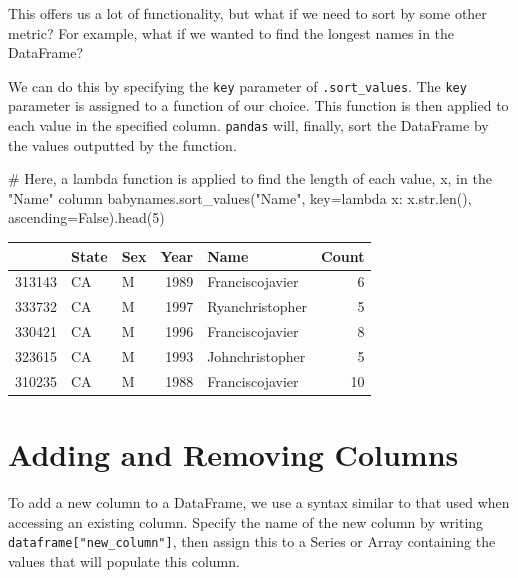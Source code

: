\documentclass[
  letterpaper,
  DIV=11,
  numbers=noendperiod]{scrreprt}
\newenvironment{Shaded}{\begin{snugshade}}{\end{snugshade}}
\newcommand{\BuiltInTok}[1]{\textcolor[rgb]{0.00,0.23,0.31}{#1}}
\newcommand{\CommentTok}[1]{\textcolor[rgb]{0.37,0.37,0.37}{#1}}
\newcommand{\DecValTok}[1]{\textcolor[rgb]{0.68,0.00,0.00}{#1}}
\newcommand{\KeywordTok}[1]{\textcolor[rgb]{0.00,0.23,0.31}{#1}}
\newcommand{\NormalTok}[1]{\textcolor[rgb]{0.00,0.23,0.31}{#1}}
\newcommand{\OperatorTok}[1]{\textcolor[rgb]{0.37,0.37,0.37}{#1}}
\newcommand{\StringTok}[1]{\textcolor[rgb]{0.13,0.47,0.30}{#1}}
\newcommand{\VariableTok}[1]{\textcolor[rgb]{0.07,0.07,0.07}{#1}}
\begin{document}
This offers us a lot of functionality, but what if we need to sort by
some other metric? For example, what if we wanted to find the longest
names in the DataFrame?

We can do this by specifying the \texttt{key} parameter of
\texttt{.sort\_values}. The \texttt{key} parameter is assigned to a
function of our choice. This function is then applied to each value in
the specified column. \texttt{pandas} will, finally, sort the DataFrame
by the values outputted by the function.

\begin{Shaded}
\begin{Highlighting}[]
\CommentTok{\# Here, a lambda function is applied to find the length of each value, \textasciigrave{}x\textasciigrave{}, in the "Name" column}
\NormalTok{babynames.sort\_values(}\StringTok{"Name"}\NormalTok{, key}\OperatorTok{=}\KeywordTok{lambda}\NormalTok{ x: x.}\BuiltInTok{str}\NormalTok{.}\BuiltInTok{len}\NormalTok{(), ascending}\OperatorTok{=}\VariableTok{False}\NormalTok{).head(}\DecValTok{5}\NormalTok{)}
\end{Highlighting}
\end{Shaded}

\begin{tabular}{lllrlr}
\toprule
{} & State & Sex &  Year &             Name &  Count \\
\midrule
313143 &    CA &   M &  1989 &  Franciscojavier &      6 \\
333732 &    CA &   M &  1997 &  Ryanchristopher &      5 \\
330421 &    CA &   M &  1996 &  Franciscojavier &      8 \\
323615 &    CA &   M &  1993 &  Johnchristopher &      5 \\
310235 &    CA &   M &  1988 &  Franciscojavier &     10 \\
\bottomrule
\end{tabular}

\hypertarget{adding-and-removing-columns}{%
\section{Adding and Removing
Columns}\label{adding-and-removing-columns}}

To add a new column to a DataFrame, we use a syntax similar to that used
when accessing an existing column. Specify the name of the new column by
writing \texttt{dataframe{[}"new\_column"{]}}, then assign this to a
Series or Array containing the values that will populate this column.
\end{document}
